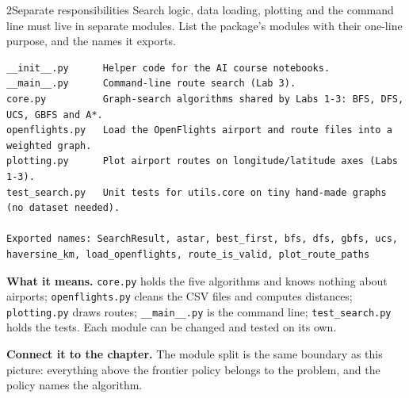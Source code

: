\begin{labquestion}{2}{Separate responsibilities}
Search logic, data loading, plotting and the command line must live in separate modules. List the package's modules with their one-line purpose, and the names it exports.
\end{labquestion}
\begin{labanswer}

\begin{refoutput}
\begin{lstlisting}[style=utpterminal]
__init__.py      Helper code for the AI course notebooks.
__main__.py      Command-line route search (Lab 3).
core.py          Graph-search algorithms shared by Labs 1-3: BFS, DFS, UCS, GBFS and A*.
openflights.py   Load the OpenFlights airport and route files into a weighted graph.
plotting.py      Plot airport routes on longitude/latitude axes (Labs 1-3).
test_search.py   Unit tests for utils.core on tiny hand-made graphs (no dataset needed).

Exported names: SearchResult, astar, best_first, bfs, dfs, gbfs, ucs, haversine_km, load_openflights, route_is_valid, plot_route_paths
\end{lstlisting}
\end{refoutput}

\textbf{What it means.} \texttt{core.py} holds the five algorithms and knows nothing about airports; \texttt{openflights.py} cleans the CSV files and computes distances; \texttt{plotting.py} draws routes; \texttt{\_\_main\_\_.py} is the command line; \texttt{test\_search.py} holds the tests. Each module can be changed and tested on its own.
\end{labanswer}

\textbf{Connect it to the chapter.} The module split is the same boundary as this picture: everything above the frontier policy belongs to the problem, and the policy names the algorithm.


